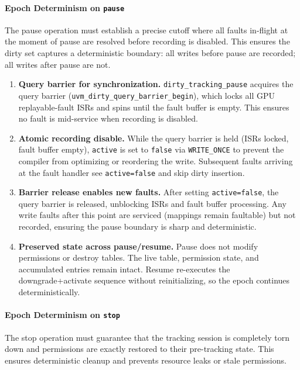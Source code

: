 \vspace{1em}

\paragraph{Epoch Determinism on \texttt{pause}}
The pause operation must establish a precise cutoff where all faults in-flight at
the moment of pause are resolved before recording is disabled. This ensures the
dirty set captures a deterministic boundary: all writes before pause are recorded;
all writes after pause are not.

\begin{enumerate}
    \item \textbf{Query barrier for synchronization.}
          \texttt{dirty\_tracking\_pause} acquires the query barrier
          (\texttt{uvm\_dirty\_query\_barrier\_begin}), which locks all GPU
          replayable-fault ISRs and spins until the fault buffer is empty.
          This ensures no fault is mid-service when recording is disabled.

    \item \textbf{Atomic recording disable.}
          While the query barrier is held (ISRs locked, fault buffer empty),
          \texttt{active} is set to \texttt{false} via \texttt{WRITE\_ONCE} to
          prevent the compiler from optimizing or reordering the write. Subsequent
          faults arriving at the fault handler see \texttt{active=false} and skip
          dirty insertion.

    \item \textbf{Barrier release enables new faults.}
          After setting \texttt{active=false}, the query barrier is released,
          unblocking ISRs and fault buffer processing. Any write faults after this
          point are serviced (mappings remain faultable) but not recorded, ensuring
          the pause boundary is sharp and deterministic.

    \item \textbf{Preserved state across pause/resume.}
          Pause does not modify permissions or destroy tables. The live table,
          permission state, and accumulated entries remain intact. Resume
          re-executes the downgrade+activate sequence without reinitializing,
          so the epoch continues deterministically.
\end{enumerate}

\vspace{1em}

\paragraph{Epoch Determinism on \texttt{stop}}
The stop operation must guarantee that the tracking session is completely torn
down and permissions are exactly restored to their pre-tracking state. This
ensures deterministic cleanup and prevents resource leaks or stale permissions.

